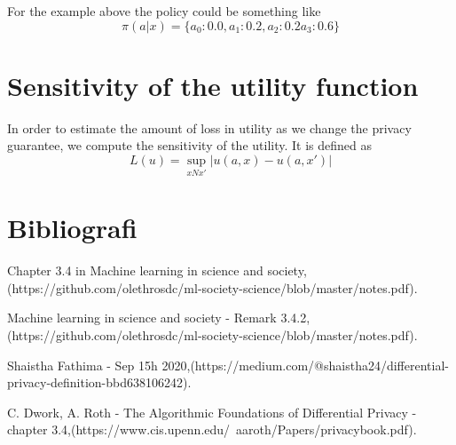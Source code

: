 \documentclass[a4paper, 12pt]{extarticle}
\begin{document}
\noindent For the example above the policy could be something like
$$ \pi(a|x) = \{ a_0: 0.0, a_1: 0.2 , a_2:  0.2  a_3: 0.6 \} $$

\section*{Sensitivity of the utility function}
In order to estimate the amount of loss in utility as we change the privacy guarantee, we compute the sensitivity of the utility. It is defined as 
$$ L(u) = \sup_{xNx'} |u(a,x) - u(a,x')|$$

\section*{Bibliografi}
\noindent [1] Chapter 3.4 in Machine learning in science and society,\newline (https://github.com/olethrosdc/ml-society-science/blob/master/notes.pdf).\newline

\noindent [2]  Machine learning in science and society - Remark 3.4.2,\newline (https://github.com/olethrosdc/ml-society-science/blob/master/notes.pdf).\newline

\noindent [3] Shaistha Fathima - Sep 15h 2020,\newline (https://medium.com/@shaistha24/differential-privacy-definition-bbd638106242). \newline

\noindent [4] C. Dwork, A. Roth - The Algorithmic Foundations of Differential Privacy - chapter 3.4,\newline (https://www.cis.upenn.edu/~aaroth/Papers/privacybook.pdf). \newline
\end{document}
